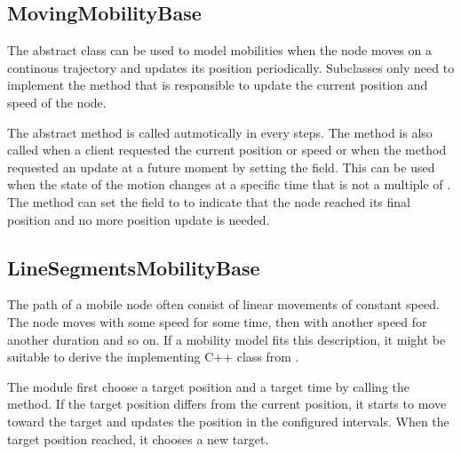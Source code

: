 \subsection{MovingMobilityBase}

The abstract  class can be used to model
mobilities when the node moves on a continous trajectory and
updates its position periodically. Subclasses only need to implement
the  method that is responsible to update the current
position and speed of the node.

The abstract  method is called autmotically in every
 steps. The method is also called when a client
requested the current position or speed or when the  method
requested an update at a future moment by setting the 
field. This can be used when the state of the motion changes at a
specific time that is not a multiple of .
The method can set the  field to  to
indicate that the node reached its final position and no more position
update is needed.


\subsection{LineSegmentsMobilityBase}

The path of a mobile node often consist of linear movements of constant
speed. The node moves with some speed for some time, then with another
speed for another duration and so on. If a mobility model fits this
description, it might be suitable to derive the implementing C++ class
from .

The module first choose a target position and a target time by calling
the  method. If the target position differs
from the current position, it starts to move toward the target and
updates the position in the configured  intervals.
When the target position reached, it chooses a new target.



